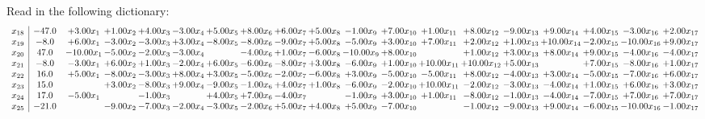 \documentclass[9pt]{article}
\begin{document}
Read in the following dictionary:
\[\begin{array}{c| c c@{\hskip 2pt} c@{\hskip 2pt} c@{\hskip 2pt} c@{\hskip 2pt} c@{\hskip 2pt} c@{\hskip 2pt} c@{\hskip 2pt} c@{\hskip 2pt} c@{\hskip 2pt} c@{\hskip 2pt} c@{\hskip 2pt} c@{\hskip 2pt} c@{\hskip 2pt} c@{\hskip 2pt} c@{\hskip 2pt} c@{\hskip 2pt} c@{\hskip 2pt} }
 x_{18}   &  -47.0 & +  3.00 x_{1} & +  1.00 x_{2} & +  4.00 x_{3} & -3.00 x_{4} & +  5.00 x_{5} & +  8.00 x_{6} & +  6.00 x_{7} & +  5.00 x_{8} & -1.00 x_{9} & +  7.00 x_{10} & +  1.00 x_{11} & +  8.00 x_{12} & -9.00 x_{13} & +  9.00 x_{14} & +  4.00 x_{15} & -3.00 x_{16} & +  2.00 x_{17}\\
 x_{19}   &  -8.0 & +  6.00 x_{1} & -3.00 x_{2} & -3.00 x_{3} & +  3.00 x_{4} & -8.00 x_{5} & -8.00 x_{6} & -9.00 x_{7} & +  5.00 x_{8} & -5.00 x_{9} & +  3.00 x_{10} & +  7.00 x_{11} & +  2.00 x_{12} & +  1.00 x_{13} & + 10.00 x_{14} & -2.00 x_{15} & -10.00 x_{16} & +  9.00 x_{17}\\
 x_{20}   &  47.0 & -10.00 x_{1} & -5.00 x_{2} & -2.00 x_{3} & -3.00 x_{4} &   & -4.00 x_{6} & +  1.00 x_{7} & -6.00 x_{8} & -10.00 x_{9} & +  8.00 x_{10} &   & +  1.00 x_{12} & +  3.00 x_{13} & +  8.00 x_{14} & +  9.00 x_{15} & -4.00 x_{16} & -4.00 x_{17}\\
 x_{21}   &  -8.0 & -3.00 x_{1} & +  6.00 x_{2} & +  1.00 x_{3} & -2.00 x_{4} & +  6.00 x_{5} & -6.00 x_{6} & -8.00 x_{7} & +  3.00 x_{8} & -6.00 x_{9} & +  1.00 x_{10} & + 10.00 x_{11} & + 10.00 x_{12} & +  5.00 x_{13} &   & +  7.00 x_{15} & -8.00 x_{16} & +  1.00 x_{17}\\
 x_{22}   &  16.0 & +  5.00 x_{1} & -8.00 x_{2} & -3.00 x_{3} & +  8.00 x_{4} & +  3.00 x_{5} & -5.00 x_{6} & -2.00 x_{7} & -6.00 x_{8} & +  3.00 x_{9} & -5.00 x_{10} & -5.00 x_{11} & +  8.00 x_{12} & -4.00 x_{13} & +  3.00 x_{14} & -5.00 x_{15} & -7.00 x_{16} & +  6.00 x_{17}\\
 x_{23}   &  15.0  &   & +  3.00 x_{2} & -8.00 x_{3} & +  9.00 x_{4} & -9.00 x_{5} & -1.00 x_{6} & +  4.00 x_{7} & +  1.00 x_{8} & -6.00 x_{9} & -2.00 x_{10} & + 10.00 x_{11} & -2.00 x_{12} & -3.00 x_{13} & -4.00 x_{14} & +  1.00 x_{15} & +  6.00 x_{16} & +  3.00 x_{17}\\
 x_{24}   &  17.0 & -5.00 x_{1} &   & -1.00 x_{3} &   & +  4.00 x_{5} & +  7.00 x_{6} & -4.00 x_{7} &   & -1.00 x_{9} & +  3.00 x_{10} & +  1.00 x_{11} & -8.00 x_{12} & -1.00 x_{13} & -4.00 x_{14} & -7.00 x_{15} & +  7.00 x_{16} & +  7.00 x_{17}\\
 x_{25}   &  -21.0  &   & -9.00 x_{2} & -7.00 x_{3} & -2.00 x_{4} & -3.00 x_{5} & -2.00 x_{6} & +  5.00 x_{7} & +  4.00 x_{8} & +  5.00 x_{9} & -7.00 x_{10} &   & -1.00 x_{12} & -9.00 x_{13} & +  9.00 x_{14} & -6.00 x_{15} & -10.00 x_{16} & -1.00 x_{17}\\

\end{array}\]
\end{document}
